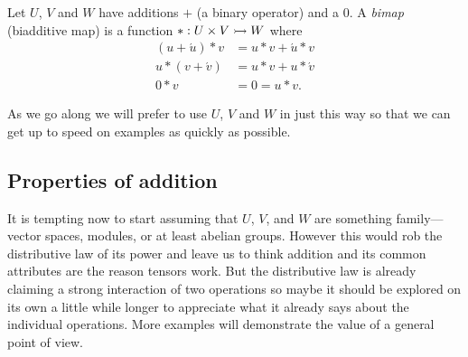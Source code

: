 \begin{definition}
    Let $U$, $V$ and $W$ have additions $+$ (a binary operator) and a $0$.
    A \emph{bimap} (biadditive map) is a function $*:U\times V\rightarrowtail W$ where 
    \begin{align*}
        (u+\acute{u})* v & = u*v + \acute{u}*v \\
        u*(v+\acute{v}) & = u*v + u*\acute{v}\\
        0 * v & = 0 = u*v.
    \end{align*}
\end{definition}

As we go along we will prefer to use $U$, $V$ and $W$ in just this way so that 
we can get up to speed on examples as quickly as possible.

\subsection{Properties of addition}
It is tempting now to start  assuming that $U$, $V$, and $W$ are 
something family---vector spaces, modules, or at least abelian groups.
However this would rob the distributive law of its power and leave us to think 
addition and its common attributes are the reason tensors work.  But the 
distributive law is already claiming a strong interaction of two operations 
so maybe it should be explored on its own a little while longer to appreciate 
what it already says about the individual operations.  More examples will demonstrate 
the value of a general point of view.

